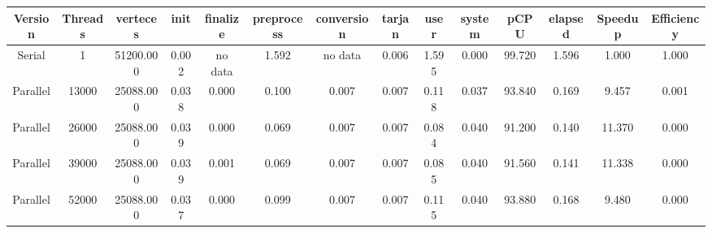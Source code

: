 \begin{tabular}{|c|c|c|c|c|c|c|c|c|c|c|c|c|c|}
\toprule
 Version &  Threads &  verteces &  init & finalize &  preprocess & conversion &  tarjan &  user &  system &   pCPU &  elapsed &  Speedup &  Efficiency \\
\midrule
  Serial &        1 & 51200.000 & 0.002 &  no data &       1.592 &    no data &   0.006 & 1.595 &   0.000 & 99.720 &    1.596 &    1.000 &       1.000 \\
Parallel &    13000 & 25088.000 & 0.038 &    0.000 &       0.100 &      0.007 &   0.007 & 0.118 &   0.037 & 93.840 &    0.169 &    9.457 &       0.001 \\
Parallel &    26000 & 25088.000 & 0.039 &    0.000 &       0.069 &      0.007 &   0.007 & 0.084 &   0.040 & 91.200 &    0.140 &   11.370 &       0.000 \\
Parallel &    39000 & 25088.000 & 0.039 &    0.001 &       0.069 &      0.007 &   0.007 & 0.085 &   0.040 & 91.560 &    0.141 &   11.338 &       0.000 \\
Parallel &    52000 & 25088.000 & 0.037 &    0.000 &       0.099 &      0.007 &   0.007 & 0.115 &   0.040 & 93.880 &    0.168 &    9.480 &       0.000 \\
\bottomrule
\end{tabular}
